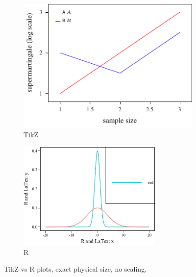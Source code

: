 \documentclass[aos,preprint]{imsart}
\begin{document}
\begin{figure}[htb]
    \centering
    \begin{subfigure}[t]{2.8in}
        \includegraphics{scatterplot-tikz.pdf}
        \caption{TikZ}
    \end{subfigure}\hfill
    \begin{subfigure}[t]{2.8in}
        \includegraphics[width=2.8in]{scatterplot-R.pdf}
        \caption{R}
    \end{subfigure}

    \caption{TikZ vs R plots, exact physical size, no scaling.}
\end{figure}
\end{document}

